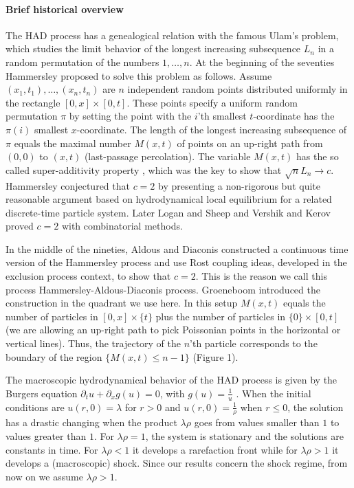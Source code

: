 \documentclass[reqno, 12pt]{amsart}
\begin{document}
\paragraph{\bf Brief historical overview} The HAD process has a genealogical
relation with the famous Ulam's problem, which studies the limit behavior of the
longest increasing subsequence $L_n$ in a random permutation of the numbers
$1,\dots,n$. At the beginning of the seventies Hammersley \cite{h} proposed to
solve this problem as follows. Assume $(x_1,t_1),\dots,(x_n,t_n)$ are $n$
independent random points distributed uniformly in the rectangle
$[0,x]\times[0,t]$. These points specify a uniform random permutation $\pi$ by
setting the point with the $i$'th smallest $t$-coordinate has the $\pi(i)$
smallest $x$-coordinate. The length of the longest increasing subsequence of
$\pi$ equals the maximal number $M(x,t)$ of points on an up-right path from
$(0,0)$ to $(x,t)$ (last-passage percolation). The variable $M(x,t)$ has the so
called super-additivity property \cite{h+}, which was the key to show that
$\sqrt{n}L_n\to c$.  Hammersley conjectured that $c=2$ by presenting a
non-rigorous but quite reasonable argument based on hydrodynamical local
equilibrium for a related discrete-time particle system. Later Logan and Sheep
\cite{ls} and Vershik and Kerov \cite{kv} proved $c=2$ with combinatorial
methods.

In the middle of the nineties, Aldous and Diaconis \cite{ad}
constructed a continuous time version of the Hammersley process and
use Rost \cite{r} coupling ideas, developed in the exclusion process
context, to show that $c=2$. This is the reason we call this process
Hammersley-Aldous-Diaconis process. Groeneboom \cite{g} introduced
the construction in the quadrant we use here. In this setup $M(x,t)$
equals the number of particles in $[0,x]\times\{t\}$ plus the number
of particles in $\{0\}\times [0,t]$ (we are allowing an up-right
path to pick Poissonian points in the horizontal or vertical lines).
Thus, the trajectory of the $n$'th particle corresponds to the
boundary of the region $\{ M(x,t)\leq n-1\}$ (Figure 1).

The macroscopic hydrodynamical behavior of the HAD process is given by the
Burgers equation $\partial_t u+ \partial_x g(u) = 0$, with $g(u)=\frac{1}{u}$
\cite{s}. When the initial conditions are $u(r,0)=\lambda$ for $r>0$ and
$u(r,0)=\frac1\rho$ when $r\le 0$, the solution has a drastic changing when the
product $\lambda\rho$ goes from values smaller than $1$ to values greater than
$1$. For $\lambda\rho=1$, the system is stationary and the solutions are
constants in time. For $\lambda\rho<1$ it develops a rarefaction front while for
$\lambda\rho>1$ it develops a (macroscopic) shock. Since our results concern the
shock regime, from now on we assume $\lambda\rho>1$.
\end{document}
